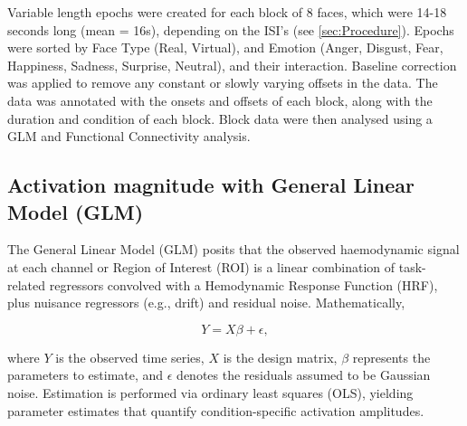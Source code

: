 Variable length epochs were created for each block of 8 faces, which were 14-18 seconds long (mean = 16s), depending on the ISI's (see \ref{sec:Procedure}).
Epochs were sorted by Face Type (Real, Virtual), and Emotion (Anger, Disgust, Fear, Happiness, Sadness, Surprise, Neutral), and their interaction.
Baseline correction was applied to remove any constant or slowly varying offsets in the data. 
The data was annotated with the onsets and offsets of each block, along with the duration and condition of each block. 
Block data were then analysed using a GLM and Functional Connectivity analysis. 

\subsection{Activation magnitude with General Linear Model (GLM)}
\label{sec:GLM}
The General Linear Model (GLM) posits that the observed haemodynamic signal at each channel or Region of Interest (ROI) is a linear combination of task-related regressors convolved with a Hemodynamic Response Function (HRF), plus nuisance regressors (e.g., drift) and residual noise. Mathematically, 

\begin{equation}
Y = X\beta + \epsilon,
\end{equation}

where \( Y \) is the observed time series, \( X \) is the design matrix, \( \beta \) represents the parameters to estimate, and \( \epsilon \) denotes the residuals assumed to be Gaussian noise.
Estimation is performed via ordinary least squares (OLS), yielding parameter estimates that quantify condition-specific activation amplitudes.

